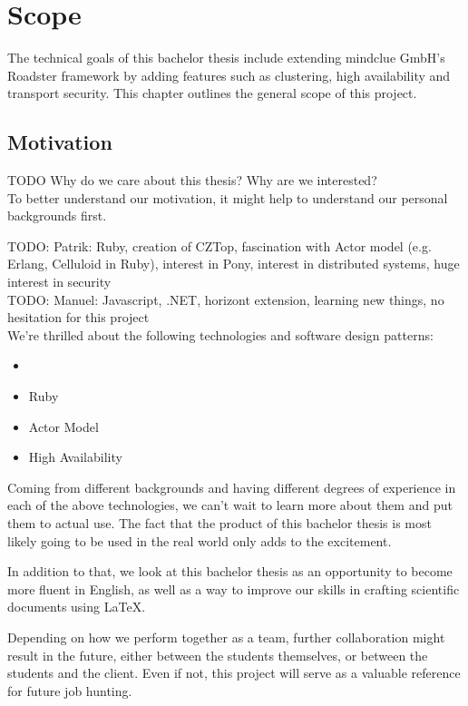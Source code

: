 \chapter{Scope}
The technical goals of this bachelor thesis include extending mindclue GmbH's
Roadster framework by adding features such as clustering, high availability and
transport security. This chapter outlines the general scope of this project.

\section{Motivation}
TODO Why do we care about this thesis? Why are we interested?\\

To better understand our motivation, it might help to understand our personal backgrounds first.

TODO: Patrik: Ruby, creation of CZTop, fascination with Actor model (e.g. Erlang, Celluloid in Ruby), interest in Pony, interest in distributed systems, huge interest in security\\
TODO: Manuel: Javascript, .NET, horizont extension, learning new things, no hesitation for this project\\

We're thrilled about the following technologies and software design patterns:

\begin{itemize}
	\item \zmq
	\item Ruby
	\item Actor Model
	\item High Availability
\end{itemize}

Coming from different backgrounds and having different degrees of experience in
each of the above technologies, we can't wait to learn more about them and put
them to actual use. The fact that the product of this bachelor thesis is most
likely going to be used in the real world only adds to the excitement.

In addition to that, we look at this bachelor thesis as an opportunity to
become more fluent in English, as well as a way to improve our skills in
crafting scientific documents using {\LaTeX}.

Depending on how we perform together as a team, further collaboration might
result in the future, either between the students themselves, or between the
students and the client. Even if not, this project will serve as a valuable
reference for future job hunting.

